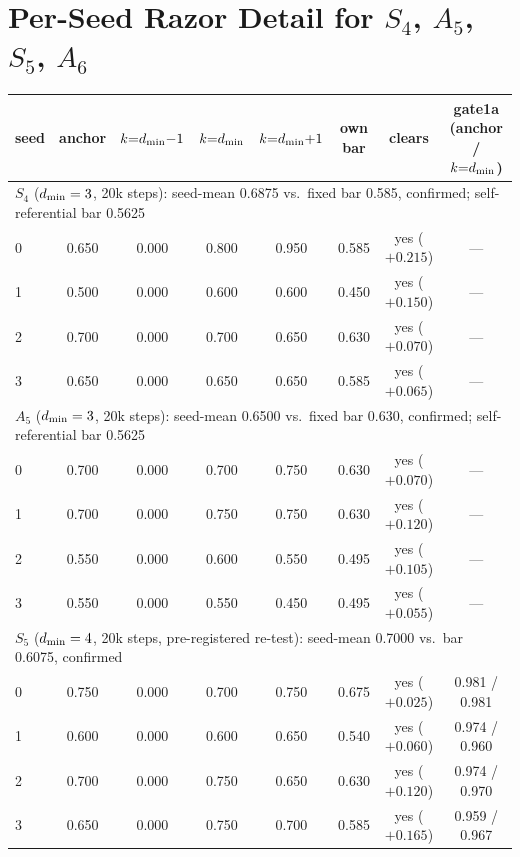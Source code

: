 \begingroup
\setlength{\intextsep}{0pt}
\section{Per-Seed Razor Detail for $S_4$, $A_5$, $S_5$, $A_6$}
\label{app:ext4causal}

\begin{table}[H]
\centering
\footnotesize
\setlength{\tabcolsep}{4pt}
\begin{tabular}{lccccccc}
\toprule
seed & anchor & $k{=}d_{\min}{-}1$ & $k{=}d_{\min}$ & $k{=}d_{\min}{+}1$ & own bar & clears & gate1a (anchor / $k{=}d_{\min}$) \\
\midrule
\multicolumn{8}{l}{$S_4$ ($d_{\min} = 3$, 20k steps): seed-mean 0.6875 vs.\ fixed bar 0.585, confirmed; self-referential bar 0.5625} \\
0 & 0.650 & 0.000 & 0.800 & 0.950 & 0.585 & yes ($+0.215$) & --- \\
1 & 0.500 & 0.000 & 0.600 & 0.600 & 0.450 & yes ($+0.150$) & --- \\
2 & 0.700 & 0.000 & 0.700 & 0.650 & 0.630 & yes ($+0.070$) & --- \\
3 & 0.650 & 0.000 & 0.650 & 0.650 & 0.585 & yes ($+0.065$) & --- \\
\midrule
\multicolumn{8}{l}{$A_5$ ($d_{\min} = 3$, 20k steps): seed-mean 0.6500 vs.\ fixed bar 0.630, confirmed; self-referential bar 0.5625} \\
0 & 0.700 & 0.000 & 0.700 & 0.750 & 0.630 & yes ($+0.070$) & --- \\
1 & 0.700 & 0.000 & 0.750 & 0.750 & 0.630 & yes ($+0.120$) & --- \\
2 & 0.550 & 0.000 & 0.600 & 0.550 & 0.495 & yes ($+0.105$) & --- \\
3 & 0.550 & 0.000 & 0.550 & 0.450 & 0.495 & yes ($+0.055$) & --- \\
\midrule
\multicolumn{8}{l}{$S_5$ ($d_{\min} = 4$, 20k steps, pre-registered re-test): seed-mean 0.7000 vs.\ bar 0.6075, confirmed} \\
0 & 0.750 & 0.000 & 0.700 & 0.750 & 0.675 & yes ($+0.025$) & 0.981 / 0.981 \\
1 & 0.600 & 0.000 & 0.600 & 0.650 & 0.540 & yes ($+0.060$) & 0.974 / 0.960 \\
2 & 0.700 & 0.000 & 0.750 & 0.650 & 0.630 & yes ($+0.120$) & 0.974 / 0.970 \\
3 & 0.650 & 0.000 & 0.750 & 0.700 & 0.585 & yes ($+0.165$) & 0.959 / 0.967 \\

\end{tabular}
\end{table}
